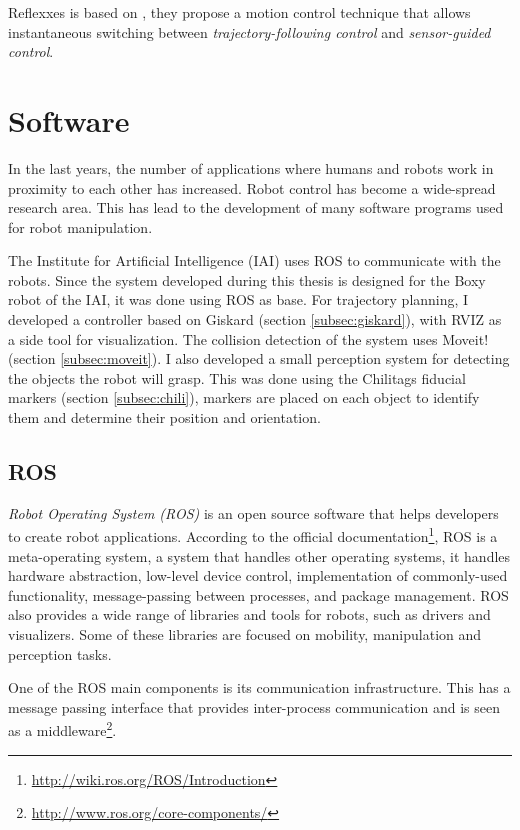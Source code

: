 Reflexxes is based on \citet{reflexxes_theory}, they propose a motion control technique that allows instantaneous switching between \textit{trajectory-following control} and  \textit{sensor-guided control}.


\section{Software}
In the last years, the number of applications where humans and robots work in proximity to each other has increased. Robot control has become a wide-spread research area. This has lead to the development of many software programs used for robot manipulation. 

The  Institute for Artificial Intelligence (IAI) uses ROS to communicate with the robots. Since the system developed during this thesis is designed for the Boxy robot of the IAI, it was done using ROS as base. For trajectory planning, I developed a controller based on Giskard (section \ref{subsec:giskard}), with RVIZ as a side tool for visualization. The collision detection of the system uses Moveit! (section \ref{subsec:moveit}). I also developed a small perception system for detecting the objects the robot will grasp. This was done using the Chilitags fiducial markers (section \ref{subsec:chili}), markers are placed on each object to identify them and determine their position and orientation.

\subsection{ROS}
\label{sec:ros}

\textit{Robot Operating System (ROS)} is an open source software that helps developers to create robot applications. According to the official documentation\footnote{\url{http://wiki.ros.org/ROS/Introduction}}, ROS is a meta-operating system, a system that handles other operating systems, it handles hardware abstraction, low-level device control, implementation of commonly-used functionality, message-passing between processes, and package management. ROS also provides a wide range of libraries and tools for robots, such as drivers and visualizers. Some of these libraries are focused on mobility, manipulation and perception tasks.

One of the ROS main components is its communication infrastructure. This has a message passing interface that provides inter-process communication and is seen as a middleware\footnote{\url{http://www.ros.org/core-components/}}. 

